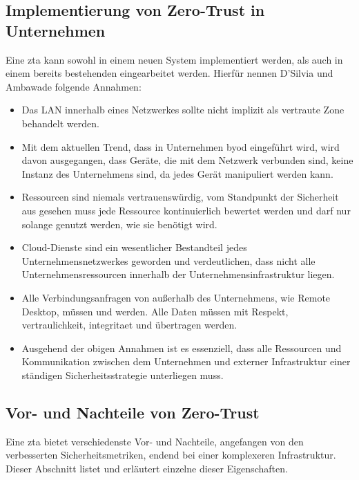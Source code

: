 \subsection{Implementierung von Zero-Trust in Unternehmen}\label{subsec:implementierung-von-zero-trust-in-unternehmen}
Eine \gls{zta} kann sowohl in einem neuen System implementiert werden, als auch in einem bereits bestehenden eingearbeitet werden.
Hierfür nennen D'Silvia und Ambawade\autocite[\vglf][]{dsilvia-2021} folgende Annahmen:
\begin{itemize}
    \item Das LAN innerhalb eines Netzwerkes sollte nicht implizit als vertraute Zone behandelt werden.
    \item Mit dem aktuellen Trend, dass in Unternehmen \gls{byod} eingeführt wird, wird davon ausgegangen, dass Geräte, die mit dem Netzwerk verbunden sind, keine Instanz des Unternehmens sind, da jedes Gerät manipuliert werden kann.
    \item Ressourcen sind niemals vertrauenswürdig, \dah vom Standpunkt der Sicherheit aus gesehen muss jede Ressource kontinuierlich bewertet werden und darf nur solange genutzt werden, wie sie benötigt wird.
    \item Cloud-Dienste sind ein wesentlicher Bestandteil jedes Unternehmensnetzwerkes geworden und verdeutlichen, dass nicht alle Unternehmensressourcen innerhalb der Unternehmensinfrastruktur liegen.
    \item Alle Verbindungsanfragen von außerhalb des Unternehmens, wie \zb Remote Desktop, müssen  und  werden.
    Alle Daten müssen mit Respekt, \gls{vertraulichkeit}, \gls{integritaet} und  übertragen werden.
    \item Ausgehend der obigen Annahmen ist es essenziell, dass alle Ressourcen und Kommunikation zwischen dem Unternehmen und externer Infrastruktur einer ständigen Sicherheitsstrategie unterliegen muss.
\end{itemize}

\subsection{Vor- und Nachteile von Zero-Trust}\label{subsec:vor-und-nachteile-von-zero-trust}
Eine \gls{zta} bietet verschiedenste Vor- und Nachteile, angefangen von den verbesserten Sicherheitsmetriken, endend bei einer komplexeren Infrastruktur.
Dieser Abschnitt listet und erläutert einzelne dieser Eigenschaften.


